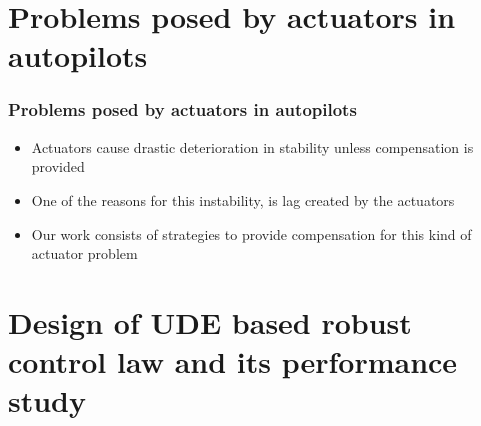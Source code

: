 \documentclass[table,10pt,red]{beamer}	%
\begin{document}
\section{Problems posed by actuators in autopilots} %
\begin{frame}
	\frametitle{Problems posed by actuators in autopilots}
 	\begin{itemize}  %
		\item Actuators cause drastic deterioration in stability unless compensation is provided
		\item One of the reasons for this instability, is lag created by the actuators
		\item Our work consists of strategies to provide compensation for this kind of actuator problem
	\end{itemize}
\end{frame}
\section{Design of UDE based robust control law and its performance study} %
\end{document}
